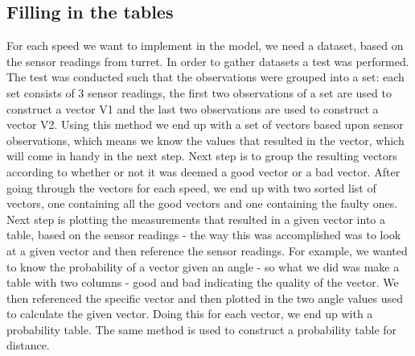 \subsection{Filling in the tables}
For each speed we want to implement in the model, we need a dataset, based on the sensor readings from turret. In order to gather datasets a test was performed. The test was conducted such that the observations were grouped into a set: each set consists of 3 sensor readings, the first two observations of a set are used to construct a vector V1 and the last two observations are used to construct a vector V2. Using this method we end up with a set of vectors based upon sensor observations, which means we know the values that resulted in the vector, which will come in handy in the next step.
Next step is to group the resulting vectors according to whether or not it was deemed a good vector or a bad vector. After going through the vectors for each speed, we end up with two sorted list of vectors, one containing all the good vectors and one containing the faulty ones. Next step is plotting the  measurements that resulted in a given vector into a table, based on the sensor readings - the way this was accomplished was to look at a given vector and then reference the sensor readings. For example, we wanted to know the probability of a vector given an angle - so what we did was make a table with two columns - good and bad indicating the quality of the vector. We then referenced the specific vector and then plotted in the two angle values used to calculate the given vector. Doing this for each vector, we end up with a probability table. The same method is used to construct a probability table for distance.
